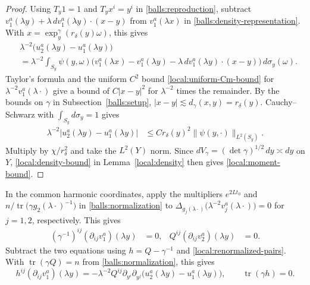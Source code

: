 \documentclass[11pt,a4paper]{article}
\theoremstyle{definition}
\theoremstyle{remark}
\numberwithin{equation}{section}
\begin{document}
\begin{proof}
Using $T_y1=1$ and $T_yx^i=y^i$ in \eqref{balls:reproduction},
subtract $v_1^a(\lambda y)+\lambda\,dv_1^a(\lambda y)\cdot(x-y)$ from
$v_1^a(\lambda x)$ in \eqref{balls:density-representation}.
With $x=\exp_y^\gamma(r_\delta(y)\omega)$, this gives
\begin{align*}
 &\lambda^{-2}\bigl(u_2^a(\lambda y)-u_1^a(\lambda y)\bigr)\\
 &=\lambda^{-2}\int_{S_y}\psi(y,\omega)
 \bigl(v_1^a(\lambda x)-v_1^a(\lambda y)
        -\lambda\,dv_1^a(\lambda y)\cdot(x-y)\bigr)\,d\sigma_y(\omega).
\end{align*}
Taylor's formula and the uniform $C^2$ bound
\eqref{local:uniform-Cm-bound} for $\lambda^{-2}v_1^a(\lambda\cdot)$
give a bound of $C|x-y|^2$ for
$\lambda^{-2}$ times the remainder. By the bounds on $\gamma$
in Subsection~\ref{balls:setup},
$|x-y|\lesssim d_\gamma(x,y)=r_\delta(y)$.
Cauchy--Schwarz with $\int_{S_y}d\sigma_y=1$ gives
\begin{align*}
 \lambda^{-2}\bigl|u_2^a(\lambda y)-u_1^a(\lambda y)\bigr|
 &\le C r_\delta(y)^2\|\psi(y,\cdot)\|_{L^2(S_y)}.
\end{align*}
Multiply by $\chi/r_\delta^2$ and take the $L^2(Y)$ norm.
Since $dV_\gamma=(\det\gamma)^{1/2}\,dy\asymp dy$ on $Y$,
\eqref{local:density-bound} in Lemma~\ref{local:density} then gives
\eqref{local:moment-bound}.
\end{proof}

In the common harmonic coordinates, apply the multipliers $e^{2Lt_0}$
and $n/\operatorname{tr}\bigl(\gamma g_2(\lambda\cdot)^{-1}\bigr)$ in
\eqref{balls:normalization} to
$\Delta_{g_j(\lambda\cdot)}\bigl(\lambda^{-2}v_j^a(\lambda\cdot)\bigr)=0$
for $j=1,2$, respectively. This gives
\begin{align*}
 (\gamma^{-1})^{ij}(\partial_{ij}v_1^a)(\lambda y)&=0,
 &Q^{ij}(\partial_{ij}v_2^a)(\lambda y)&=0.
\end{align*}
Subtract the two equations using $h=Q-\gamma^{-1}$ and
\eqref{local:renormalized-pairs}. With $\operatorname{tr}(\gamma Q)=n$
from \eqref{balls:normalization}, this gives
\begin{equation}\label{local:metric-system}
 h^{ij}(\partial_{ij}v_1^a)(\lambda y)
 =-\lambda^{-2}Q^{ij}\partial_{y^i}\partial_{y^j}
     \bigl(u_2^a(\lambda y)-u_1^a(\lambda y)\bigr),
 \qquad \operatorname{tr}(\gamma h)=0.
\end{equation}
\end{document}
